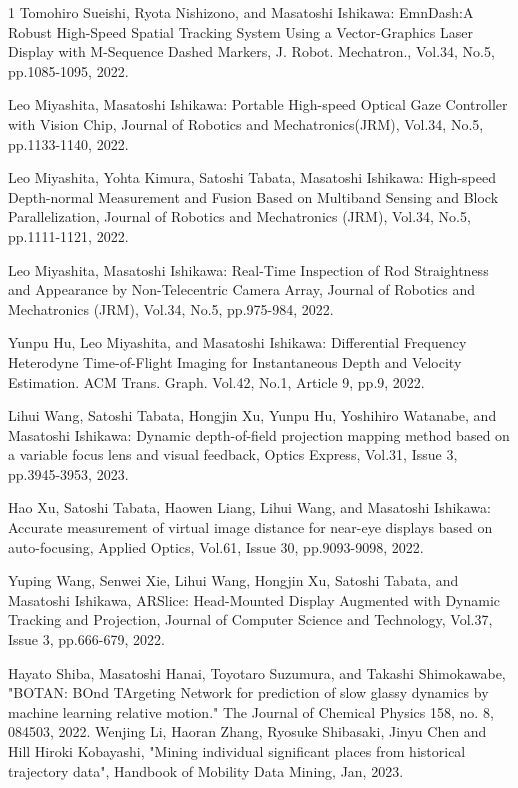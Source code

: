 \begin{雑誌論文}{1}
Tomohiro Sueishi, Ryota Nishizono, and Masatoshi Ishikawa: EmnDash:A Robust High-Speed Spatial Tracking System Using a Vector-Graphics Laser Display with M-Sequence Dashed Markers, J. Robot. Mechatron., Vol.34, No.5, pp.1085-1095, 2022.


Leo Miyashita, Masatoshi Ishikawa: Portable High-speed Optical Gaze Controller with Vision Chip, Journal of Robotics and Mechatronics(JRM), Vol.34, No.5, pp.1133-1140, 2022.

Leo Miyashita, Yohta Kimura, Satoshi Tabata, Masatoshi Ishikawa: High-speed Depth-normal Measurement and Fusion Based on Multiband Sensing and Block Parallelization, Journal of Robotics and Mechatronics (JRM), Vol.34, No.5, pp.1111-1121, 2022.

Leo Miyashita, Masatoshi Ishikawa: Real-Time Inspection of Rod Straightness and Appearance by Non-Telecentric Camera Array, Journal of Robotics and Mechatronics (JRM), Vol.34, No.5, pp.975-984, 2022.

Yunpu Hu, Leo Miyashita, and Masatoshi Ishikawa: Differential Frequency Heterodyne Time-of-Flight Imaging for Instantaneous Depth and Velocity Estimation. ACM Trans. Graph. Vol.42, No.1, Article 9, pp.9, 2022.


Lihui Wang, Satoshi Tabata, Hongjin Xu, Yunpu Hu, Yoshihiro Watanabe, and Masatoshi Ishikawa: Dynamic depth-of-field projection mapping method based on a variable focus lens and visual feedback, Optics Express, Vol.31, Issue 3, pp.3945-3953, 2023.

Hao Xu, Satoshi Tabata, Haowen Liang, Lihui Wang, and Masatoshi Ishikawa: Accurate measurement of virtual image distance for near-eye displays based on auto-focusing, Applied Optics, Vol.61, Issue 30, pp.9093-9098, 2022.

Yuping Wang, Senwei Xie, Lihui Wang, Hongjin Xu, Satoshi Tabata, and Masatoshi Ishikawa, ARSlice: Head-Mounted Display Augmented with Dynamic Tracking and Projection, Journal of Computer Science and Technology, Vol.37, Issue 3, pp.666-679, 2022.

Hayato Shiba, Masatoshi Hanai, Toyotaro Suzumura, and Takashi Shimokawabe, "BOTAN: BOnd TArgeting Network for prediction of slow glassy dynamics by machine learning relative motion." The Journal of Chemical Physics 158, no. 8, 084503, 2022.
Wenjing Li, Haoran Zhang, Ryosuke Shibasaki,  Jinyu Chen and Hill Hiroki Kobayashi,  "Mining individual significant places from historical trajectory data", Handbook of Mobility Data Mining, Jan, 2023.


\end{雑誌論文}
